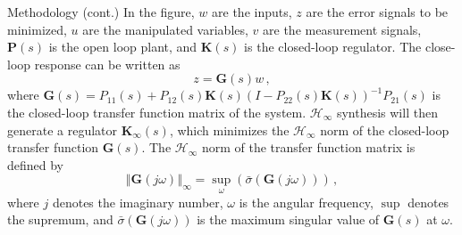 \documentclass{beamer}
\begin{document}
\begin{frame}[t]
\begin{columns}[t]
\begin{column}{0.32\linewidth}
\begin{block}{Methodology (cont.)}
			In the figure, $w$ are the inputs, $z$ are the error signals to be minimized, $u$ are the manipulated variables, $v$ are the measurement signals, $\mathbf{P}(s)$ is the open loop plant, and $\mathbf{K}(s)$ is the closed-loop regulator.
			The close-loop response can be written as
			\begin{equation}
				z=\mathbf{G}(s)w\,,
			\end{equation}
			where $\mathbf{G}(s) = P_{11}(s) + P_{12}(s)\mathbf{K}(s)\left(I-P_{22}(s)\mathbf{K}(s)\right)^{-1}P_{21}(s)$ is the closed-loop transfer function matrix of the system.
			$\mathcal{H}_\infty$ synthesis will then generate a regulator $\mathbf{K}_\infty(s)$, which minimizes the $\mathcal{H}_\infty$ norm of the closed-loop transfer function $\mathbf{G}(s)$.
			The $\mathcal{H}_\infty$ norm of the transfer function matrix is defined by
			\begin{equation}
				\left\Vert\mathbf{G}(j\omega)\right\Vert_\infty = \sup_\omega\left(\bar\sigma(\mathbf{G}(j\omega))\right)\,,
			\end{equation}
			where $j$ denotes the imaginary number, $\omega$ is the angular frequency, $\sup$ denotes the supremum, and $\bar\sigma(\mathbf{G}(j\omega))$ is the maximum singular value of $\mathbf{G}(s)$ at $\omega$.
			
			\medskip
			

\end{block}
\end{column}
\end{columns}
\end{frame}
\end{document}
